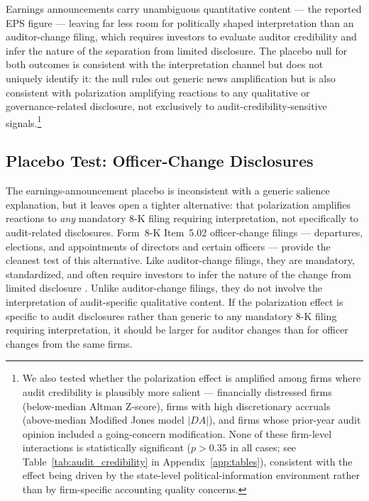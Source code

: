 \documentclass[12pt]{article}
\begin{document}
Earnings announcements carry unambiguous quantitative content --- the reported
EPS figure --- leaving far less room for politically shaped interpretation than
an auditor-change filing, which requires investors to evaluate auditor
credibility and infer the nature of the separation from limited disclosure. The
placebo null for both outcomes is consistent with the interpretation
channel but does not uniquely identify it: the null rules out generic
news amplification but is also consistent with polarization amplifying
reactions to any qualitative or governance-related disclosure, not
exclusively to audit-credibility-sensitive signals.\footnote{%
We also tested whether the polarization effect is amplified among
firms where audit credibility is plausibly more salient --- financially
distressed firms (below-median Altman Z-score), firms with high discretionary
accruals (above-median Modified Jones model $|DA|$), and firms whose prior-year
audit opinion included a going-concern modification. None of these firm-level
interactions is statistically significant ($p > 0.35$ in all cases;
see Table~\ref{tab:audit_credibility} in Appendix~\ref{app:tables}),
consistent with the effect being driven by the state-level
political-information environment rather than by firm-specific accounting
quality concerns.}



\subsection{Placebo Test: Officer-Change Disclosures}
\label{sec:placebo_502}

The earnings-announcement placebo is inconsistent with a generic salience explanation,
but it leaves open a tighter alternative: that polarization amplifies
reactions to \emph{any} mandatory 8-K filing requiring interpretation, not
specifically to audit-related disclosures. Form~8-K Item~5.02 officer-change
filings --- departures, elections, and appointments of directors and
certain officers --- provide the cleanest test of this alternative. Like
auditor-change filings, they are mandatory, standardized, and often require
investors to infer the nature of the change from limited disclosure
\citep{ghosh2015}. Unlike auditor-change filings, they do not involve the interpretation
of audit-specific qualitative content. If the polarization effect is
specific to audit disclosures rather than generic to any mandatory 8-K
filing requiring interpretation, it should be larger for auditor changes
than for officer changes from the same firms.
\end{document}
